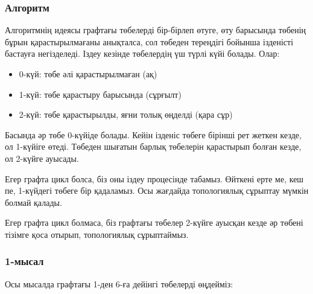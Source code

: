 \subsubsection{Алгоритм}

Алгоритмнің идеясы графтағы төбелерді 
бір-бірлеп өтуге, өту барысында төбенің бұрын қарастырылмағаны анықталса, 
сол төбеден тереңдігі бойынша ізденісті бастауға негізделеді.
Іздеу кезінде төбелердің үш түрлі күйі болады. Олар:

\begin{itemize}

\item 0-күй: төбе әлі қарастырылмаған (ақ)
\item 1-күй: төбе қарастыру барысында (сұрғылт)
\item 2-күй: төбе қарастырылды, яғни толық өңделді (қара сұр)
\end{itemize}

Басында әр төбе 0-күйіде болады. Кейін ізденіс төбеге бірінші рет жеткен кезде, ол 1-күйіге өтеді. Төбеден 
шығатын барлық төбелерін қарастырып болған кезде, ол 
2-күйге ауысады.

Егер графта цикл болса, біз оны іздеу процесінде табамыз. Өйткені ерте ме, кеш пе, 1-күйдегі төбеге бір қадаламыз.  Осы жағдайда топологиялық сұрыптау мүмкін болмай қалады.

Егер графта цикл болмаса, біз графтағы төбелер 2-күйге
ауысқан кезде әр төбені тізімге қоса отырып, топологиялық сұрыптаймыз.


\subsubsection{1-мысал}

Осы мысалда графтағы 1-ден 6-ға дейінгі төбелерді
өңдейміз:

